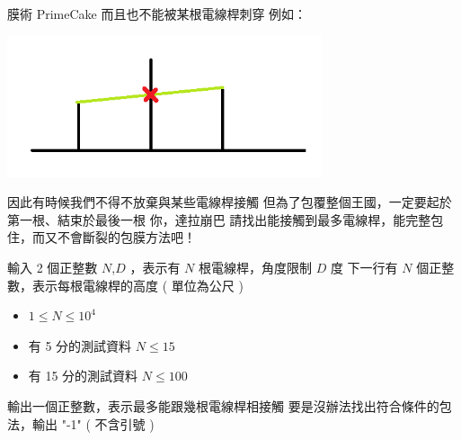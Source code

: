 \begin{problem}{膜術 PrimeCake}
而且也不能被某根電線桿刺穿\newline
例如：\newline

\centerline{\includegraphics[width=25em]{./pics/D-3.png}}

因此有時候我們不得不放棄與某些電線桿接觸\newline
但為了包覆整個王國，一定要起於第一根、結束於最後一根\newline
\newline
\newline
你，達拉崩巴\newline
請找出能接觸到最多電線桿，能完整包住，而又不會斷裂的包膜方法吧！\newline


\InputFile

輸入 2 個正整數 $N$,$D$ ，表示有 $N$ 根電線桿，角度限制 $D$ 度 \newline
下一行有 $N$ 個正整數，表示每根電線桿的高度 ( 單位為公尺 ) \newline

\begin{iofmt}
\begin{itemize}
	\item $1 \leq N \leq 10^4$
	\item 有 5 分的測試資料 $N \leq 15$
	\item 有 15 分的測試資料 $N \leq 100$
\end{itemize}
\end{iofmt}

\OutputFile

輸出一個正整數，表示最多能跟幾根電線桿相接觸\newline
要是沒辦法找出符合條件的包法，輸出 "-1" ( 不含引號 )\newline

\Examples

\begin{example}
\end{example}

\end{problem}
